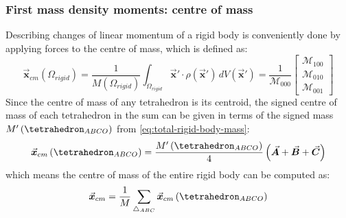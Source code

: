 \documentclass[oneside, a4paper]{book}
\newcommand\vek[1]{\vec{\bm{#1}}}
\newcommand\br[1]{\left(#1\right)}
\begin{document}
    \subsubsection{First mass density moments: centre of mass}\label{subsubsec:centre-of-mass}
    Describing changes of linear momentum of a rigid body is conveniently done by applying forces to the centre of mass, which is defined as:
    \begin{equation}
      \vek{x}_{cm}\br{\Omega_{rigid}} = \frac{1}{M\br{\Omega_{rigid}}}\int_{\Omega_{rigid}} \vek{x}' \cdot \rho\br{\vek{x}'} \, dV\br{\vek{x}'} = \frac{1}{\mathcal{M}_{000}}\begin{bmatrix}
        \mathcal{M}_{100}\\
        \mathcal{M}_{010}\\
        \mathcal{M}_{001}
      \end{bmatrix}
    \end{equation}
    Since the centre of mass of any tetrahedron is its centroid, the signed centre of mass of each tetrahedron in the sum can be given in terms of the signed mass $M'\br{\tetrahedron_{ABCO}}$ from \autoref{eq:total-rigid-body-mass}:
    \begin{equation}
      \vek{x}_{cm}\br{\tetrahedron_{ABCO}} = \frac{M'\br{\tetrahedron_{ABCO}}}{4}\br{\vek{A}+\vek{B}+\vek{C}}
    \end{equation}
    which means the centre of mass of the entire rigid body can be computed as:
    \begin{equation}
      \vek{x}_{cm} = \frac{1}{M} \sum_{\triangle_{ABC}}\vek{x}_{cm}\br{\tetrahedron_{ABCO}}
    \end{equation}
\end{document}
